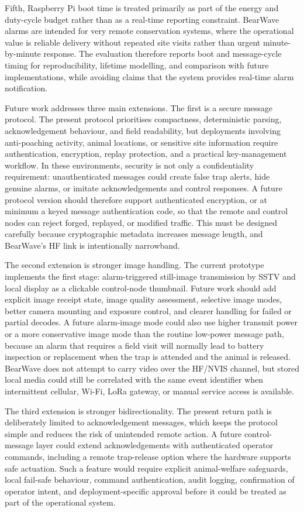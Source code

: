 \documentclass[acmsmall,screen]{acmart}
\begin{document}
Fifth, Raspberry Pi boot time is treated primarily as part of the energy and duty-cycle budget rather than as a real-time reporting constraint. BearWave alarms are intended for very remote conservation systems, where the operational value is reliable delivery without repeated site visits rather than urgent minute-by-minute response. The evaluation therefore reports boot and message-cycle timing for reproducibility, lifetime modelling, and comparison with future implementations, while avoiding claims that the system provides real-time alarm notification.

Future work addresses three main extensions. The first is a secure message protocol. The present protocol prioritises compactness, deterministic parsing, acknowledgement behaviour, and field readability, but deployments involving anti-poaching activity, animal locations, or sensitive site information require authentication, encryption, replay protection, and a practical key-management workflow. In these environments, security is not only a confidentiality requirement: unauthenticated messages could create false trap alerts, hide genuine alarms, or imitate acknowledgements and control responses. A future protocol version should therefore support authenticated encryption, or at minimum a keyed message authentication code, so that the remote and control nodes can reject forged, replayed, or modified traffic. This must be designed carefully because cryptographic metadata increases message length, and BearWave's HF link is intentionally narrowband.

The second extension is stronger image handling. The current prototype implements the first stage: alarm-triggered still-image transmission by SSTV and local display as a clickable control-node thumbnail. Future work should add explicit image receipt state, image quality assessment, selective image modes, better camera mounting and exposure control, and clearer handling for failed or partial decodes. A future alarm-image mode could also use higher transmit power or a more conservative image mode than the routine low-power message path, because an alarm that requires a field visit will normally lead to battery inspection or replacement when the trap is attended and the animal is released. BearWave does not attempt to carry video over the HF/NVIS channel, but stored local media could still be correlated with the same event identifier when intermittent cellular, Wi-Fi, LoRa gateway, or manual service access is available.

The third extension is stronger bidirectionality. The present return path is deliberately limited to acknowledgement messages, which keeps the protocol simple and reduces the risk of unintended remote action. A future control-message layer could extend acknowledgements with authenticated operator commands, including a remote trap-release option where the hardware supports safe actuation. Such a feature would require explicit animal-welfare safeguards, local fail-safe behaviour, command authentication, audit logging, confirmation of operator intent, and deployment-specific approval before it could be treated as part of the operational system.
\end{document}
